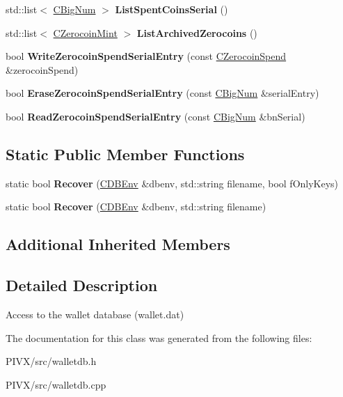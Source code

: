 \begin{DoxyCompactItemize}
std\+::list$<$ \mbox{\hyperlink{class_c_big_num}{C\+Big\+Num}} $>$ {\bfseries List\+Spent\+Coins\+Serial} ()
\item 
\mbox{\label{class_c_wallet_d_b_ab47fd5db0074ff3f1807ad4d9b448ec7}} 
std\+::list$<$ \mbox{\hyperlink{class_c_zerocoin_mint}{C\+Zerocoin\+Mint}} $>$ {\bfseries List\+Archived\+Zerocoins} ()
\item 
\mbox{\label{class_c_wallet_d_b_a5a7e57d473eecccc8ea6aaa49893159c}} 
bool {\bfseries Write\+Zerocoin\+Spend\+Serial\+Entry} (const \mbox{\hyperlink{class_c_zerocoin_spend}{C\+Zerocoin\+Spend}} \&zerocoin\+Spend)
\item 
\mbox{\label{class_c_wallet_d_b_afc8ef7cd02d72b779ff1cfc08637f748}} 
bool {\bfseries Erase\+Zerocoin\+Spend\+Serial\+Entry} (const \mbox{\hyperlink{class_c_big_num}{C\+Big\+Num}} \&serial\+Entry)
\item 
\mbox{\label{class_c_wallet_d_b_a8913787be5585ea2039920ade85a1850}} 
bool {\bfseries Read\+Zerocoin\+Spend\+Serial\+Entry} (const \mbox{\hyperlink{class_c_big_num}{C\+Big\+Num}} \&bn\+Serial)
\end{DoxyCompactItemize}
\subsection*{Static Public Member Functions}
\begin{DoxyCompactItemize}
\item 
\mbox{\label{class_c_wallet_d_b_a3ebeb12f37d9c66512e2bc2903a6854a}} 
static bool {\bfseries Recover} (\mbox{\hyperlink{class_c_d_b_env}{C\+D\+B\+Env}} \&dbenv, std\+::string filename, bool f\+Only\+Keys)
\item 
\mbox{\label{class_c_wallet_d_b_a44388f1c3ee63191dcb78b1001e9390c}} 
static bool {\bfseries Recover} (\mbox{\hyperlink{class_c_d_b_env}{C\+D\+B\+Env}} \&dbenv, std\+::string filename)
\end{DoxyCompactItemize}
\subsection*{Additional Inherited Members}


\subsection{Detailed Description}
Access to the wallet database (wallet.\+dat) 

The documentation for this class was generated from the following files\+:\begin{DoxyCompactItemize}
\item 
P\+I\+V\+X/src/walletdb.\+h\item 
P\+I\+V\+X/src/walletdb.\+cpp\end{DoxyCompactItemize}
